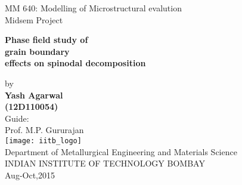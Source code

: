 \begin{titlepage}
\begin{center}
\vspace{0.1in}
\Large{ MM 640: Modelling of Microstructural evalution \\ Midsem Project}\\
\vspace{0.6in}

{\Huge {\bf 
Phase field study of \\ grain boundary\\ 
\vspace{0.1in}
effects on spinodal decomposition }} \\
\vspace{0.5in}


by\\
\vspace{0.2in}
{\bf Yash Agarwal\\(12D110054)} \\ 
\vspace{0.5in}
Guide: \\ 
Prof. M.P. Gururajan\\
\vspace{0.3in}
\texttt{[image: iitb\_logo]}\\
\vspace{0.1in}
{\normalsize
Department of Metallurgical Engineering and Materials Science\\ 

\vspace{2mm}
INDIAN INSTITUTE OF TECHNOLOGY BOMBAY\\
\vspace{3mm}
Aug-Oct,2015 \\
}
\end{center}
\thispagestyle{empty}
\end{titlepage}

